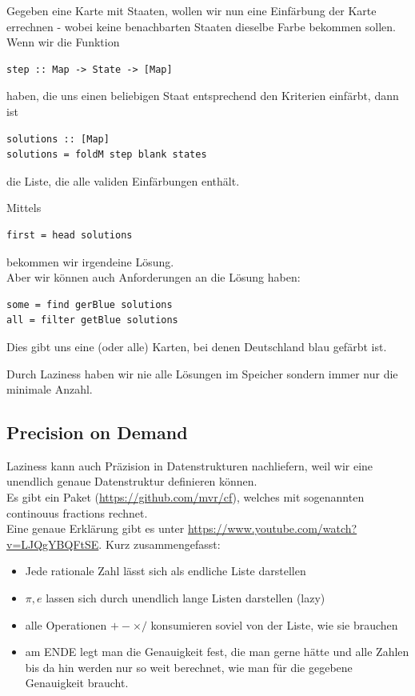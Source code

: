 \documentclass{beamer}
\begin{document}
\begin{frame}[fragile]
Gegeben eine Karte mit Staaten, wollen wir nun eine Einfärbung der Karte errechnen - wobei keine benachbarten Staaten dieselbe Farbe bekommen sollen.\\\pause
Wenn wir die Funktion
\begin{verbatim}
step :: Map -> State -> [Map]
\end{verbatim}
haben, die uns einen beliebigen Staat entsprechend den Kriterien einfärbt, dann ist \\\pause
\begin{verbatim}
solutions :: [Map]
solutions = foldM step blank states
\end{verbatim}
die Liste, die alle validen Einfärbungen enthält.
\end{frame}

\begin{frame}[fragile]
Mittels
\begin{verbatim}
first = head solutions
\end{verbatim}
bekommen wir irgendeine Lösung.\\\pause
Aber wir können auch Anforderungen an die Lösung haben:
\begin{verbatim}
some = find gerBlue solutions
all = filter getBlue solutions
\end{verbatim}
\pause
Dies gibt uns eine (oder alle) Karten, bei denen Deutschland blau gefärbt ist.\\\pause\par\bigskip
Durch Laziness haben wir nie alle Lösungen im Speicher sondern immer nur die minimale Anzahl.
\end{frame}

\subsection{Precision on Demand}

\begin{frame}[fragile]
Laziness kann auch Präzision in Datenstrukturen nachliefern, weil wir eine unendlich genaue Datenstruktur definieren können.\\\pause
Es gibt ein Paket (\url{https://github.com/mvr/cf}), welches mit sogenannten continouus fractions rechnet.\\\pause
Eine genaue Erklärung gibt es unter \url{https://www.youtube.com/watch?v=LJQgYBQFtSE}. Kurz zusammengefasst:\\\pause
\begin{itemize}
 \item Jede rationale Zahl lässt sich als endliche Liste darstellen
 \pause
 \item $\pi,e$ lassen sich durch unendlich lange Listen darstellen (lazy)
 \pause
 \item alle Operationen $+ - \times /$ konsumieren soviel von der Liste, wie sie brauchen
 \pause
 \item am ENDE legt man die Genauigkeit fest, die man gerne hätte und alle Zahlen bis da hin werden nur so weit berechnet, wie man für die gegebene Genauigkeit braucht.
\end{itemize}

\end{frame}
\end{document}
